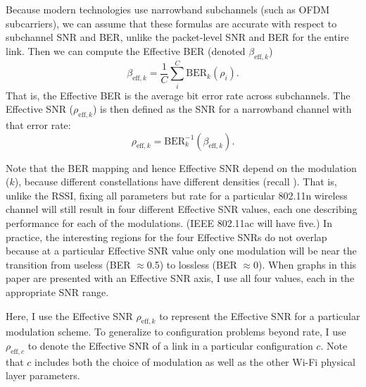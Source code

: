 Because modern technologies use narrowband subchannels (such as OFDM subcarriers), we can assume that these formulas are accurate with respect to subchannel SNR and BER, unlike the packet-level SNR and BER for the entire link. Then we can compute the Effective BER (denoted $\beta_{\text{eff},k}$)
\begin{equation}
	\label{eq:effective_ber}
	\beta_{\text{eff},k} = \frac{1}{C} \sum_{i}^{C} \text{BER}_k(\rho_i).
\end{equation}
That is, the Effective BER is the average bit error rate across subchannels. The Effective SNR ($\rho_{\text{eff},k}$) is then defined as the SNR for a narrowband channel with that error rate:
\begin{equation}
	\label{eq:effective_snr}
	\rho_{\text{eff},k} = \text{BER}_k^{-1}(\beta_{\text{eff},k}).
\end{equation}

Note that the BER mapping and hence Effective SNR depend on the modulation ($k$), because different constellations have different densities (recall ). That is, unlike the RSSI, fixing all parameters but rate for a particular 802.11n wireless channel will still result in four different Effective SNR values, each one describing performance for each of the modulations. (IEEE 802.11ac will have five.) In practice, the interesting regions for the four Effective SNRs do not overlap because at a particular Effective SNR value only one modulation will be near the transition from useless (BER $\approx$0.5) to lossless (BER $\approx$0). When graphs in this paper are presented with an Effective SNR axis, I use all four values, each in the appropriate SNR range.

Here, I use the Effective SNR $\rho_{\text{eff},k}$ to represent the Effective SNR for a particular modulation scheme. To generalize to configuration problems beyond rate, I use $\rho_{\text{eff},c}$ to denote the Effective SNR of a link in a particular configuration $c$. Note that $c$ includes both the choice of modulation as well as the other Wi-Fi physical layer parameters.

